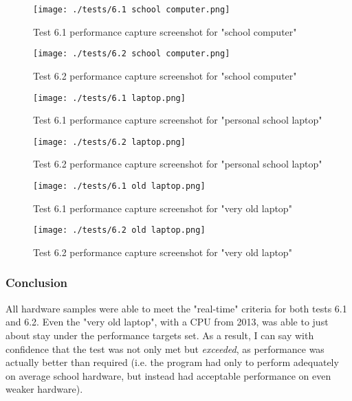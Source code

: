 \label{sec:evidence6}
\begin{figure}[H]
	\texttt{[image: ./tests/6.1 school computer.png]}
	\caption{Test 6.1 performance capture screenshot for "school computer"}
\end{figure}
\begin{figure}[H]
	\texttt{[image: ./tests/6.2 school computer.png]}
	\caption{Test 6.2 performance capture screenshot for "school computer"}
\end{figure}
\begin{figure}[H]
	\texttt{[image: ./tests/6.1 laptop.png]}
	\caption{Test 6.1 performance capture screenshot for "personal school laptop"}
\end{figure}
\begin{figure}[H]
	\texttt{[image: ./tests/6.2 laptop.png]}
	\caption{Test 6.2 performance capture screenshot for "personal school laptop"}
\end{figure}
\begin{figure}[H]
	\texttt{[image: ./tests/6.1 old laptop.png]}
	\caption{Test 6.1 performance capture screenshot for "very old laptop"}
\end{figure}
\begin{figure}[H]
	\texttt{[image: ./tests/6.2 old laptop.png]}
	\caption{Test 6.2 performance capture screenshot for "very old laptop"}
\end{figure}

\subsubsection*{Conclusion}
All hardware samples were able to meet the "real-time" criteria for both tests 6.1 and 6.2. Even the "very old laptop", with a CPU from 2013, was able to just about stay under the performance targets set. As a result, I can say with confidence that the test was not only met but \textit{exceeded}, as performance was actually better than required (i.e. the program had only to perform adequately on average school hardware, but instead had acceptable performance on even weaker hardware).